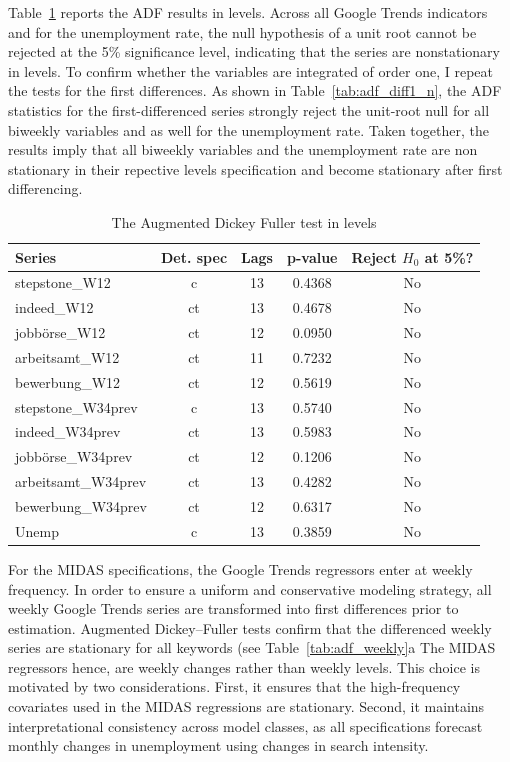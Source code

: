 \documentclass[12pt,a4paper]{article}
\begin{document}
Table~\ref{tab:adf_levels} reports the ADF results in levels. Across all Google Trends indicators and for the unemployment rate, the null hypothesis of a unit root cannot be rejected at the 5\% significance level, indicating that the series are nonstationary in levels. To confirm whether the variables are integrated of order one, I repeat the tests for the first differences. As shown in Table~\ref{tab:adf_diff1_n}, the ADF statistics for the first-differenced series strongly reject the unit-root null for all biweekly variables and as well for the unemployment rate. Taken together, the results imply that all biweekly  variables and the unemployment rate are non stationary in their repective levels specification and become stationary after first differencing.

\begin{table}
\caption{The Augmented Dickey Fuller test in levels}
\label{tab:adf_levels}
\begin{tabular}{lcccc}
\hline\hline
Series & Det. spec & Lags & p-value & Reject $H_0$ at 5\%? \\
\hline
stepstone\_W12      & c  & 13 &  0.4368 & No \\
indeed\_W12         & ct & 13 &  0.4678 & No \\
jobbörse\_W12       & ct & 12 &  0.0950 & No \\
arbeitsamt\_W12     & ct & 11 &  0.7232 & No \\
bewerbung\_W12      & ct & 12 &  0.5619 & No \\
stepstone\_W34prev  & c  & 13 &  0.5740 & No \\
indeed\_W34prev     & ct & 13 &  0.5983 & No \\
jobbörse\_W34prev   & ct & 12 &  0.1206 & No \\
arbeitsamt\_W34prev & ct & 13 &  0.4282 & No \\
bewerbung\_W34prev  & ct & 12 &  0.6317 & No \\
Unemp               & c  & 13 &  0.3859 & No \\
\hline\hline
\end{tabular}
\end{table}
For the MIDAS specifications, the Google Trends regressors enter at weekly frequency.
In order to ensure a uniform and conservative modeling strategy, all weekly
Google Trends series are transformed into first differences prior to estimation. 
Augmented Dickey–Fuller tests confirm that the differenced weekly series are stationary for all keywords (see Table~\ref{tab:adf_weekly}a
The MIDAS regressors hence, are weekly changes rather than weekly levels. This choice is motivated by two considerations. First, it ensures that the high-frequency covariates used in the MIDAS regressions are stationary. Second, it maintains interpretational consistency across model classes, as all specifications forecast monthly changes in unemployment using changes in search intensity.
\end{document}
